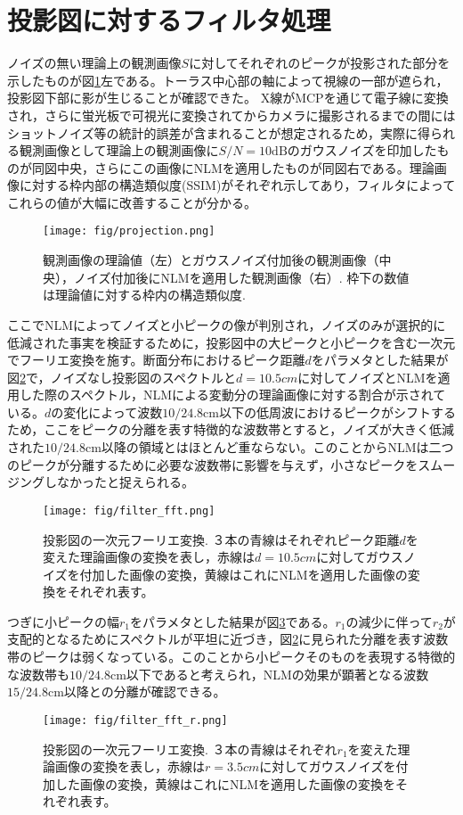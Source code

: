\section{投影図に対するフィルタ処理}
ノイズの無い理論上の観測画像$S$に対してそれぞれのピークが投影された部分を示したものが図\ref{fig:projection}左である。トーラス中心部の軸によって視線の一部が遮られ，投影図下部に影が生じることが確認できた。
X線がMCPを通じて電子線に変換され，さらに蛍光板で可視光に変換されてからカメラに撮影されるまでの間にはショットノイズ等の統計的誤差が含まれることが想定されるため，実際に得られる観測画像として理論上の観測画像に$S/N = 10\mathrm{dB}$のガウスノイズを印加したものが同図中央，さらにこの画像にNLMを適用したものが同図右である。理論画像に対する枠内部の構造類似度(SSIM)がそれぞれ示してあり，フィルタによってこれらの値が大幅に改善することが分かる。
\begin{figure}[H]
	 \centering
	 \texttt{[image: fig/projection.png]}
	 \caption{観測画像の理論値（左）とガウスノイズ付加後の観測画像（中央），ノイズ付加後にNLMを適用した観測画像（右）. 枠下の数値は理論値に対する枠内の構造類似度.}
	 \label{fig:projection}
\end{figure}
ここでNLMによってノイズと小ピークの像が判別され，ノイズのみが選択的に低減された事実を検証するために，投影図中の大ピークと小ピークを含む一次元でフーリエ変換を施す。断面分布におけるピーク距離$d$をパラメタとした結果が図\ref{fig:filter_fft}で，ノイズなし投影図のスペクトルと$d=10.5cm$に対してノイズとNLMを適用した際のスペクトル，NLMによる変動分の理論画像に対する割合が示されている。$d$の変化によって波数$10\mathrm{/24.8cm}$以下の低周波におけるピークがシフトするため，ここをピークの分離を表す特徴的な波数帯とすると，ノイズが大きく低減された$10\mathrm{/24.8cm}$以降の領域とはほとんど重ならない。このことからNLMは二つのピークが分離するために必要な波数帯に影響を与えず，小さなピークをスムージングしなかったと捉えられる。
\begin{figure}[H]
	 \centering
	 \texttt{[image: fig/filter\_fft.png]}
	 \caption{投影図の一次元フーリエ変換. ３本の青線はそれぞれピーク距離$d$を変えた理論画像の変換を表し，赤線は$d=10.5cm$に対してガウスノイズを付加した画像の変換，黄線はこれにNLMを適用した画像の変換をそれぞれ表す。}
	 \label{fig:filter_fft}
\end{figure}
つぎに小ピークの幅$r_1$をパラメタとした結果が図\ref{fig:filter_fft_r}である。$r_1$の減少に伴って$r_2$が支配的となるためにスペクトルが平坦に近づき，図\ref{fig:filter_fft}に見られた分離を表す波数帯のピークは弱くなっている。このことから小ピークそのものを表現する特徴的な波数帯も$10\mathrm{/24.8cm}$以下であると考えられ，NLMの効果が顕著となる波数$15\mathrm{/24.8cm}$以降との分離が確認できる。
\begin{figure}[H]
	 \centering
	 \texttt{[image: fig/filter\_fft\_r.png]}
	 \caption{投影図の一次元フーリエ変換. ３本の青線はそれぞれ$r_1$を変えた理論画像の変換を表し，赤線は$r=3.5cm$に対してガウスノイズを付加した画像の変換，黄線はこれにNLMを適用した画像の変換をそれぞれ表す。}
	 \label{fig:filter_fft_r}
\end{figure}
